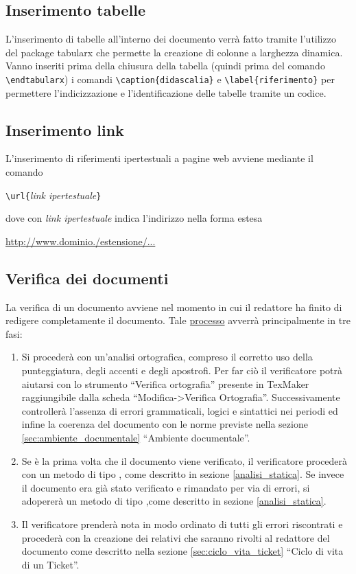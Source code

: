 \subsection{Inserimento tabelle}
L'inserimento di tabelle all'interno dei documento verrà fatto tramite l'utilizzo del package tabularx che permette la creazione di colonne a larghezza dinamica. Vanno inseriti prima della chiusura della tabella (quindi prima del comando \verb+\endtabularx+) i comandi \verb+\caption{didascalia}+ e \verb+\label{riferimento}+ per permettere l'indicizzazione e l'identificazione delle tabelle tramite un codice.

\subsection{Inserimento link}
L'inserimento di riferimenti ipertestuali a pagine web avviene mediante il comando 
\begin{center}
\verb+\url{+\textit{link ipertestuale}\verb+}+
\end{center}
dove con \textit{link ipertestuale} indica l'indirizzo nella forma estesa 
\begin{center}
\url{http://www.dominio./estensione/...}
\end{center}


\subsection{Verifica dei documenti}
\label{sec:verifica_documenti}
La verifica di un documento avviene nel momento in cui il redattore ha finito di redigere completamente il documento. Tale \underline{processo} avverrà principalmente in tre fasi:
\begin{enumerate}
\item Si procederà con un'analisi ortografica, compreso il corretto uso della punteggiatura, degli accenti e degli apostrofi. Per far ciò il verificatore potrà aiutarsi con lo strumento ``Verifica ortografia'' presente in TexMaker raggiungibile dalla scheda ``Modifica->Verifica Ortografia''. Successivamente controllerà l'assenza di errori grammaticali, logici e sintattici nei periodi ed infine la coerenza del documento con le norme previste nella sezione \ref{sec:ambiente_documentale} ``Ambiente documentale''.
\item Se è la prima volta che il documento viene verificato, il verificatore procederà con un metodo di tipo , come descritto in sezione \ref{analisi_statica}. Se invece il documento era già stato verificato e rimandato per via di errori, si adopererà un metodo di tipo ,come descritto in sezione \ref{analisi_statica}.
\item Il verificatore prenderà nota in modo ordinato di tutti gli errori riscontrati e procederà con la creazione dei  relativi che saranno rivolti al redattore del documento come descritto nella sezione \ref{sec:ciclo_vita_ticket} ``Ciclo di vita di un Ticket''.
\end{enumerate}

